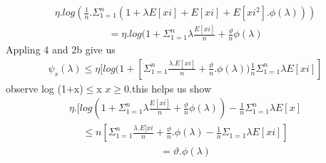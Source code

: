 \documentclass[journal,12pt,twocolumn]{IEEEtran}
\begin{document}
\begin{align}
\eta. log (\frac{1}{n}. \Sigma_{1=1}^{n}(1+\lambda E[xi]+E[xi]+E[xi^2].\phi (\lambda)))
\end{align}
\begin{align}
=\eta.log(1+\Sigma_{1=1}^{n} \lambda \frac{E[xi]}{n}+\frac{\vartheta}{n}\phi (\lambda)
\end{align}
Appling 4 and 2b give us\\
\begin{align}
\psi_s(\lambda)\leqslant \eta[log(1+[\Sigma_{1=1}^{n}\frac{\lambda.E[xi]}{n}+\frac{\vartheta}{n}.\phi (\lambda)) \frac{1}{n}\Sigma_{1=1}^{n} \lambda E[xi]]
\end{align}
observe log (1+x)$\leqslant$x $x \geqslant 0$.this helps us show\\ 
\begin{align}
\eta. [log (1+\Sigma_{1=1}^{n}\lambda \frac{E[xi]}{n}+\frac{\vartheta}{n}\phi(\lambda))-\frac{1}{n}\Sigma_{1=1}^{n}\lambda E[x]
\end{align}
\begin{align}
\leqslant n[\Sigma_{1=1}^{n}\frac{\lambda.E[xi}{n}+\frac{\vartheta}{n}.\phi (\lambda)-\frac{1}{n}\Sigma_{1=1} \lambda E[xi]]
\end{align}
\begin{align}
=\vartheta. \phi (\lambda)
\end{align}
\end{document}
